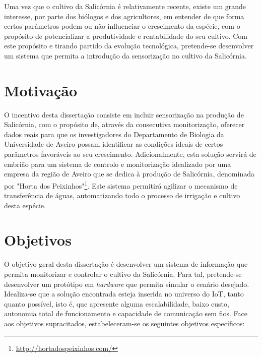 Uma vez que o cultivo da Salicórnia é relativamente recente, existe um grande interesse, por parte dos biólogos e dos agricultores, em entender de que forma certos parâmetros podem ou não influenciar o crescimento da espécie, com o propósito de potencializar a produtividade e rentabilidade do seu cultivo. Com este propósito e tirando partido da evolução tecnológica, pretende-se desenvolver um sistema que permita a introdução da sensorização no cultivo da Salicórnia.     


\section{Motivação}

O incentivo desta dissertação consiste em incluir sensorização na produção de Salicórnia, com o propósito de, através da consecutiva monitorização, oferecer dados reais para que os investigadores do Departamento de Biologia da Universidade de Aveiro possam identificar as condições ideais de certos parâmetros favoráveis ao seu crescimento. Adicionalmente, esta solução servirá de embrião para um sistema de controlo e monitorização idealizado por uma empresa da região de Aveiro que se dedica à produção de Salicórnia, denominada por "Horta dos Peixinhos"\footnote{\url{http://hortadospeixinhos.com/}}. Este sistema permitirá agilizar o mecanismo de transferência de águas, automatizando todo o processo de irrigação e cultivo desta espécie. 









\section{Objetivos}
\label{objectivos}



O objetivo geral desta dissertação é desenvolver um sistema de informação que permita monitorizar e controlar o cultivo da Salicórnia. Para tal, pretende-se desenvolver um protótipo em \textit{hardware} que permita  simular o cenário desejado. Idealiza-se que a solução encontrada esteja inserida no universo do \ac{IoT}, tanto quanto possível, isto é, que apresente alguma escalabilidade, baixo custo, autonomia total de funcionamento e capacidade de comunicação sem fios. Face aos objetivos supracitados, estabeleceram-se os seguintes objetivos específicos:




